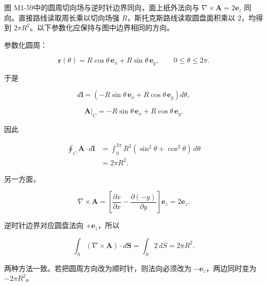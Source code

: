图 M1-59中的圆周切向场与逆时针边界同向，面上纸外法向与
\(\nabla\times\mathbf A=2\mathbf e_z\)
同向。直接路线读取周长乘以切向场强 \(R\)，斯托克斯路线读取圆盘面积乘以
\(2\)，均得到 \(2\pi R^2\)。以下参数化应保持与图中边界相同的方向。

参数化圆周：

\[
\mathbf r(\theta)
=
R\cos\theta\,\mathbf e_x
+
R\sin\theta\,\mathbf e_y,
\qquad
0\le\theta\le2\pi.
\]

于是

\[
d\mathbf l
=
\left(
-R\sin\theta\,\mathbf e_x
+
R\cos\theta\,\mathbf e_y
\right)d\theta,
\]

\[
\mathbf A|_C
=
-R\sin\theta\,\mathbf e_x
+
R\cos\theta\,\mathbf e_y.
\]

因此

\[
\begin{aligned}
\oint_C\mathbf A\cdot d\mathbf l
&=
\int_0^{2\pi}
R^2(\sin^2\theta+\cos^2\theta)\,d\theta\\
&=
\boxed{2\pi R^2}.
\end{aligned}
\]

另一方面，

\[
\nabla\times\mathbf A
=
\left[
\frac{\partial x}{\partial x}
-
\frac{\partial(-y)}{\partial y}
\right]\mathbf e_z
=
2\mathbf e_z.
\]

逆时针边界对应圆盘法向 \(+\mathbf e_z\)，所以

\[
\int_S
(\nabla\times\mathbf A)\cdot d\mathbf S
=
\int_S2\,dS
=
2\pi R^2.
\]

两种方法一致。若把圆周方向改为顺时针，则法向必须改为
\(-\mathbf e_z\)，两边同时变为 \(-2\pi R^2\)。

